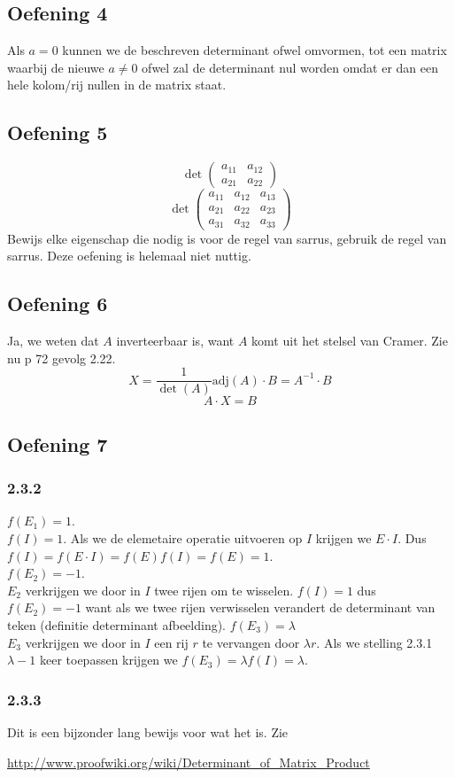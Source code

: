 \documentclass[lineaire_algebra_oplossingen.tex]{subfiles}
\begin{document}
\subsection{Oefening 4}
Als $a=0$ kunnen we de beschreven determinant ofwel omvormen, tot een matrix waarbij de nieuwe $a \neq 0$ ofwel zal de determinant nul worden omdat er dan een hele kolom/rij nullen in de matrix staat. 

\subsection{Oefening 5}
\[
\det\left(
\begin{matrix}
a_{11} & a_{12}\\
a_{21} & a_{22}
\end{matrix}
\right)
\]
\[
\det\left(
\begin{matrix}
a_{11} & a_{12} & a_{13}\\
a_{21} & a_{22} & a_{23}\\
a_{31} & a_{32} & a_{33}
\end{matrix}
\right)
\]
Bewijs elke eigenschap die nodig is voor de regel van sarrus, gebruik de regel van sarrus. Deze oefening is helemaal niet nuttig.

\subsection{Oefening 6}
Ja, we weten dat $A$ inverteerbaar is, want $A$ komt uit het stelsel van Cramer. Zie nu p 72 gevolg 2.22.
\[
X = \frac{1}{\det(A)}\text{adj}(A)\cdot B = A^{-1}\cdot B
\]
\[
A\cdot X = B
\]

\subsection{Oefening 7}
\subsubsection{2.3.2}
$f(E_1) = 1$.\\
$f(I) = 1$. Als we de elemetaire operatie uitvoeren op $I$ krijgen we $E\cdot I$. Dus $f(I) = f(E\cdot I) = f(E) f(I) = f(E)=1$.\\
$f(E_2)=-1$.\\
$E_2$ verkrijgen we door in $I$ twee rijen om te wisselen. $f(I) = 1$ dus $f(E_2)=-1$ want als we twee rijen verwisselen verandert de determinant van teken (definitie determinant afbeelding).
$f(E_3) = \lambda$\\
$E_3$ verkrijgen we door in $I$ een rij $r$ te vervangen door $\lambda r$. Als we stelling 2.3.1 $\lambda-1$ keer toepassen krijgen we $f(E_3) = \lambda f(I) = \lambda$.
\subsubsection{2.3.3}
Dit is een bijzonder lang bewijs voor wat het is. Zie 
\begin{center}
\url{http://www.proofwiki.org/wiki/Determinant_of_Matrix_Product}
\end{center}
\end{document}
